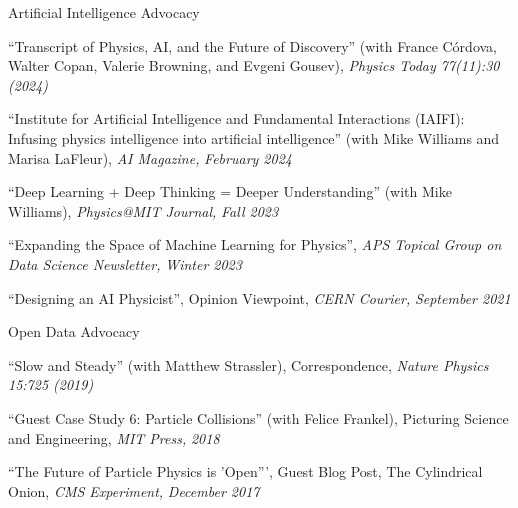 \item Artificial Intelligence Advocacy 
\bsbl 
\item ``Transcript of Physics, AI, and the Future of Discovery'' (with France Córdova, Walter Copan, Valerie Browning, and Evgeni Gousev), \emph{Physics Today 77(11):30 (2024)}
\item ``Institute for Artificial Intelligence and Fundamental Interactions (IAIFI): Infusing physics intelligence into artificial intelligence'' (with Mike Williams and Marisa LaFleur), \emph{AI Magazine,} \emph{February 2024}
\item ``Deep Learning + Deep Thinking = Deeper Understanding'' (with Mike Williams), \emph{Physics@MIT Journal,} \emph{Fall 2023}
\item ``Expanding the Space of Machine Learning for Physics'', \emph{APS Topical Group on Data Science Newsletter,} \emph{Winter 2023}
\item ``Designing an AI Physicist'', Opinion Viewpoint, \emph{CERN Courier,} \emph{September 2021}
\el 
\item Open Data Advocacy 
\bsbl 
\item ``Slow and Steady'' (with Matthew Strassler), Correspondence, \emph{Nature Physics 15:725 (2019)}
\item ``Guest Case Study 6:  Particle Collisions'' (with Felice Frankel), Picturing Science and Engineering, \emph{MIT Press,} \emph{2018}
\item ``The Future of Particle Physics is 'Open''', Guest Blog Post, The Cylindrical Onion, \emph{CMS Experiment,} \emph{December 2017}
\el 
